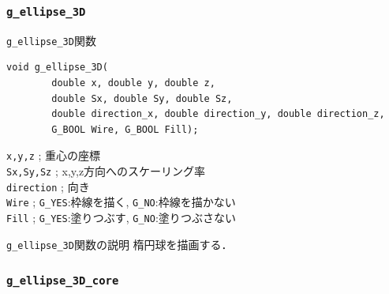 \documentclass[platex,a4paper,12pt]{jsarticle}%
\begin{document}
\clearpage
\subsubsection{\texttt{g\_ellipse\_3D}}

\begin{itembox}[l]{\texttt{g\_ellipse\_3D}関数}
\begin{verbatim}
void g_ellipse_3D(
        double x, double y, double z,
        double Sx, double Sy, double Sz,
        double direction_x, double direction_y, double direction_z,
        G_BOOL Wire, G_BOOL Fill);
\end{verbatim}
\verb|x,y,z| ; 重心の座標\\
\verb|Sx,Sy,Sz| ; x,y,z方向へのスケーリング率\\
\verb|direction| ; 向き\\
\verb|Wire| ; \verb|G_YES|:枠線を描く, \verb|G_NO|:枠線を描かない \\
\verb|Fill| ; \verb|G_YES|:塗りつぶす, \verb|G_NO|:塗りつぶさない
\end{itembox}

\begin{itembox}[l]{\texttt{g\_ellipse\_3D}関数の説明}
楕円球を描画する．
\end{itembox}



\clearpage
\subsubsection{\texttt{g\_ellipse\_3D\_core}}
\end{document}
